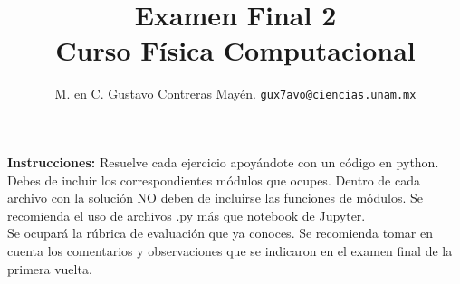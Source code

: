 
\usepackage[siunitx]{circuitikz}
\usetikzlibrary{patterns, arrows, decorations.markings}

\author{M. en C. Gustavo Contreras Mayén. \texttt{gux7avo@ciencias.unam.mx}}
\title{Examen Final 2 \\ {\large Curso Física Computacional}}
\date{ }


\maketitle
\fontsize{14}{14}\selectfont

\textbf{Instrucciones: } Resuelve cada ejercicio apoyándote con un código en python. Debes de incluir los correspondientes módulos que ocupes. Dentro de cada archivo con la solución NO deben de incluirse las funciones de módulos. Se recomienda el uso de archivos .py más que notebook de Jupyter.
\\
\noindent
Se ocupará la rúbrica de evaluación que ya conoces. Se recomienda tomar en cuenta los comentarios y observaciones que se indicaron en el examen final de la primera vuelta.

